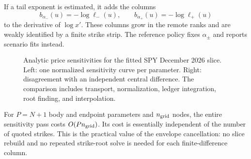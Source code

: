 If a tail exponent is estimated, it adds the columns
\begin{equation}
b_{\alpha_-}(u)=-\log\ell_-(u),
\qquad b_{\alpha_+}(u)=-\log\ell_+(u)
\label{eq:alphacolumns}
\end{equation}
to the derivative of $\log x'$.  These columns grow in the remote ranks and
are weakly identified by a finite strike strip.  The reference policy fixes
$\alpha_\pm$ and reports scenario fits instead.

\begin{figure}[htbp]
\centering
{}
\caption{Analytic price sensitivities for the fitted SPY December 2026 slice.
Left: one normalized sensitivity curve per parameter.  Right: disagreement
with an independent central difference.  The comparison includes transport,
normalization, ledger integration, root finding, and interpolation.}
\label{fig:jacobian}
\end{figure}

For $P=N+1$ body and endpoint parameters and $n_{\rm grid}$ nodes, the entire
sensitivity pass costs $O(Pn_{\rm grid})$.  Its cost is essentially independent
of the number of quoted strikes.  This is the practical value of the envelope
cancellation: no slice rebuild and no repeated strike-root solve is needed
for each finite-difference column.
